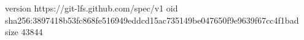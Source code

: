 version https://git-lfs.github.com/spec/v1
oid sha256:3897418b53fc868fe516949eddcd15ac735149be047650f9e9639f67cc4f1bad
size 43844
